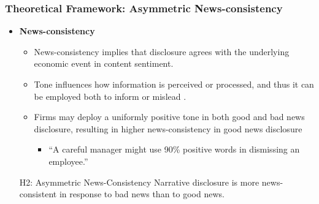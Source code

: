 \documentclass{beamer}
\begin{document}
\begin{frame}
	\frametitle{Theoretical Framework: Asymmetric News-consistency}
	\begin{itemize}
		\item \textbf{News-consistency}
		
		\begin{itemize}
			\item News-consistency implies that disclosure agrees with the underlying economic event in content sentiment. %
			\item Tone influences how information is perceived or processed, and thus it can be employed both to inform or mislead \citep{davisNumbersMeasuringInformation2012, liInformationContentForwardLooking2010, huangToneManagement2014}.
			\item Firms may deploy a uniformly positive tone in both good and bad news disclosure, resulting in higher news-consistency in good news disclosure 
			\begin{itemize}
				\item ``A careful manager might use 90\% positive words in dismissing an employee.'' \citep[p.1206]{loughranTextualAnalysisAccounting2016}
			\end{itemize}
		\end{itemize}
		
\medskip
\pause
\begin{block}{H2: Asymmetric News-Consistency}
	Narrative disclosure is more news-consistent in response to bad news than to good news.
\end{block}

		
	\end{itemize}
\end{frame}
\end{document}
